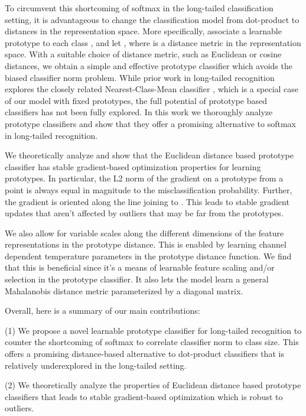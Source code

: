 \documentclass{article}
\begin{document}
To circumvent this shortcoming of softmax in the long-tailed classification setting, it is advantageous to change the classification model from dot-product to distances in the representation space. More specifically, associate a learnable prototype  to each class , and let , where  is a distance metric in the representation space. With a suitable choice of distance metric, such as Euclidean or cosine distances, we obtain a simple and effective prototype classifier which avoids the biased classifier norm problem. While prior work in long-tailed recognition explores the closely related Nearest-Class-Mean classifier \cite{kang2019decoupling}, which is a special case of our model with fixed prototypes, the full potential of prototype based classifiers has not been fully explored. In this work we thoroughly analyze prototype classifiers and show that they offer a promising alternative to softmax in long-tailed recognition.

We theoretically analyze and show that the Euclidean distance based prototype classifier has stable gradient-based optimization properties for learning prototypes. In particular, the L2 norm of the gradient on a prototype  from a point  is always equal in magnitude to the misclassification probability. Further, the gradient is oriented along the line joining  to . This leads to stable gradient updates that aren't affected by outliers that may be far from the prototypes. 

We also allow for variable scales along the different dimensions of the feature representations in the prototype distance. This is enabled by learning channel dependent temperature parameters in the prototype distance function. We find that this is beneficial since it's a means of learnable feature scaling and/or selection in the prototype classifier. 
It also lets the model learn a general Mahalanobis distance metric parameterized by a diagonal matrix. 

Overall, here is a summary of our main contributions: 

(1) We propose a novel learnable prototype classifier for long-tailed recognition to counter the shortcoming of softmax to correlate classifier norm to class size. This offers a promising distance-based alternative to dot-product classifiers that is relatively underexplored in the long-tailed setting. 

(2) We theoretically analyze the properties of Euclidean distance based prototype classifiers that leads to stable gradient-based optimization which is robust to outliers.  
\end{document}
